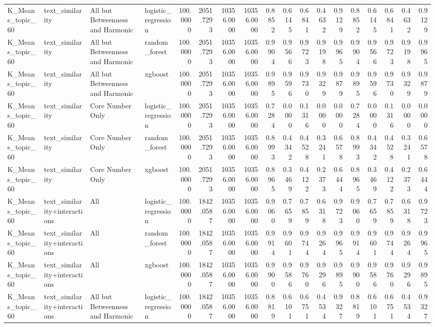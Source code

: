 \begin{tabular}{llllrrrrrrrrrrrrrr}
K_Means_topic_60 & text_similarity & All but Betweenness and Harmonic & logistic_regression & 100.0000 & 2051.7293 & 10356.0000 & 10356.0000 & 0.8852 & 0.6145 & 0.6841 & 0.4632 & 0.9129 & 0.8852 & 0.6145 & 0.6841 & 0.4632 & 0.9129 \\
K_Means_topic_60 & text_similarity & All but Betweenness and Harmonic & random_forest & 100.0000 & 2051.7293 & 10356.0000 & 10356.0000 & 0.9904 & 0.9566 & 0.9723 & 0.9198 & 0.9965 & 0.9904 & 0.9566 & 0.9723 & 0.9198 & 0.9965 \\
K_Means_topic_60 & text_similarity & All but Betweenness and Harmonic & xgboost & 100.0000 & 2051.7293 & 10356.0000 & 10356.0000 & 0.9895 & 0.9596 & 0.9730 & 0.9329 & 0.9879 & 0.9895 & 0.9596 & 0.9730 & 0.9329 & 0.9879 \\
K_Means_topic_60 & text_similarity & Core Number Only & logistic_regression & 100.0000 & 2051.7293 & 10356.0000 & 10356.0000 & 0.7284 & 0.0000 & 0.1316 & 0.0000 & 0.0000 & 0.7284 & 0.0000 & 0.1316 & 0.0000 & 0.0000 \\
K_Means_topic_60 & text_similarity & Core Number Only & random_forest & 100.0000 & 2051.7293 & 10356.0000 & 10356.0000 & 0.8993 & 0.4342 & 0.4528 & 0.3241 & 0.6578 & 0.8993 & 0.4342 & 0.4528 & 0.3241 & 0.6578 \\
K_Means_topic_60 & text_similarity & Core Number Only & xgboost & 100.0000 & 2051.7293 & 10356.0000 & 10356.0000 & 0.8965 & 0.3469 & 0.4122 & 0.2373 & 0.6444 & 0.8965 & 0.3469 & 0.4122 & 0.2373 & 0.6444 \\
K_Means_topic_60 & text_similarity+interactions & All & logistic_regression & 100.0000 & 1842.0587 & 10356.0000 & 10356.0000 & 0.9060 & 0.7659 & 0.7859 & 0.6318 & 0.9723 & 0.9060 & 0.7659 & 0.7859 & 0.6318 & 0.9723 \\
K_Means_topic_60 & text_similarity+interactions & All & random_forest & 100.0000 & 1842.0587 & 10356.0000 & 10356.0000 & 0.9914 & 0.9601 & 0.9744 & 0.9264 & 0.9965 & 0.9914 & 0.9601 & 0.9744 & 0.9264 & 0.9965 \\
K_Means_topic_60 & text_similarity+interactions & All & xgboost & 100.0000 & 1842.0587 & 10356.0000 & 10356.0000 & 0.9900 & 0.9586 & 0.9760 & 0.9296 & 0.9895 & 0.9900 & 0.9586 & 0.9760 & 0.9296 & 0.9895 \\
K_Means_topic_60 & text_similarity+interactions & All but Betweenness and Harmonic & logistic_regression & 100.0000 & 1842.0587 & 10356.0000 & 10356.0000 & 0.8819 & 0.6101 & 0.6751 & 0.4534 & 0.9327 & 0.8819 & 0.6101 & 0.6751 & 0.4534 & 0.9327 \\

\end{tabular}
